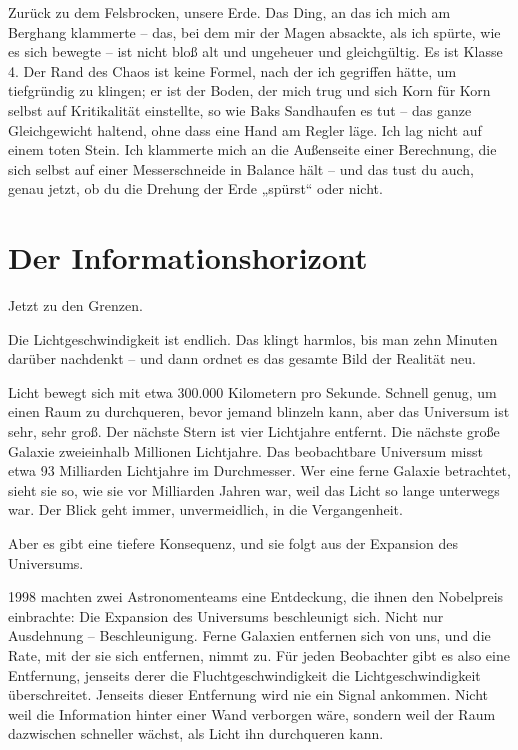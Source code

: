 \documentclass[11pt, twoside, openright]{book}
\begin{document}
Zurück zu dem Felsbrocken, unsere Erde. Das Ding, an das ich mich am Berghang klammerte -- das, bei dem mir der Magen absackte, als ich spürte, wie es sich bewegte -- ist nicht bloß alt und ungeheuer und gleichgültig. Es ist Klasse 4. Der Rand des Chaos ist keine Formel, nach der ich gegriffen hätte, um tiefgründig zu klingen; er ist der Boden, der mich trug und sich Korn für Korn selbst auf Kritikalität einstellte, so wie Baks Sandhaufen es tut -- das ganze Gleichgewicht haltend, ohne dass eine Hand am Regler läge. Ich lag nicht auf einem toten Stein. Ich klammerte mich an die Außenseite einer Berechnung, die sich selbst auf einer Messerschneide in Balance hält -- und das tust du auch, genau jetzt, ob du die Drehung der Erde „spürst“ oder nicht.


\section*{Der Informationshorizont}

Jetzt zu den Grenzen.

Die Lichtgeschwindigkeit ist endlich. Das klingt harmlos, bis man zehn Minuten darüber nachdenkt -- und dann ordnet es das gesamte Bild der Realität neu.

Licht bewegt sich mit etwa 300.000 Kilometern pro Sekunde. Schnell genug, um einen Raum zu durchqueren, bevor jemand blinzeln kann, aber das Universum ist sehr, sehr groß. Der nächste Stern ist vier Lichtjahre entfernt. Die nächste große Galaxie zweieinhalb Millionen Lichtjahre. Das beobachtbare Universum misst etwa 93 Milliarden Lichtjahre im Durchmesser. Wer eine ferne Galaxie betrachtet, sieht sie so, wie sie vor Milliarden Jahren war, weil das Licht so lange unterwegs war. Der Blick geht immer, unvermeidlich, in die Vergangenheit.

Aber es gibt eine tiefere Konsequenz, und sie folgt aus der Expansion des Universums.

1998 machten zwei Astronomenteams eine Entdeckung, die ihnen den Nobelpreis einbrachte: Die Expansion des Universums beschleunigt sich. Nicht nur Ausdehnung -- Beschleunigung. Ferne Galaxien entfernen sich von uns, und die Rate, mit der sie sich entfernen, nimmt zu. Für jeden Beobachter gibt es also eine Entfernung, jenseits derer die Fluchtgeschwindigkeit die Lichtgeschwindigkeit überschreitet. Jenseits dieser Entfernung wird nie ein Signal ankommen. Nicht weil die Information hinter einer Wand verborgen wäre, sondern weil der Raum dazwischen schneller wächst, als Licht ihn durchqueren kann.
\end{document}
